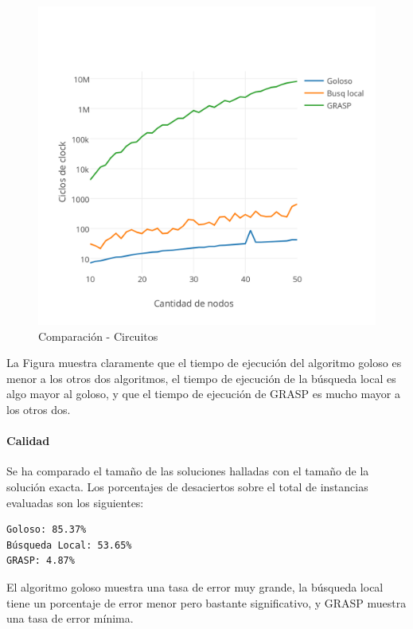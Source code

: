 \begin{figure}[htb]
	\begin{center}
    		\includegraphics[scale=0.8]{imagenes/final-circuitos.png}
	\end{center}
	\caption{Comparación - Circuitos}\label{fig:5A}
\end{figure}

La Figura muestra claramente que el tiempo de ejecución del algoritmo goloso es menor a los otros dos algoritmos, el tiempo de ejecución de la búsqueda local es algo mayor al goloso, y que el tiempo de ejecución de GRASP es mucho mayor a los otros dos.

\paragraph{Calidad} Se ha comparado el tamaño de las soluciones halladas con el tamaño de la solución exacta.  Los porcentajes de desaciertos sobre el total de instancias evaluadas son los siguientes:

\begin{verbatim}
Goloso: 85.37%
Búsqueda Local: 53.65%
GRASP: 4.87%
\end{verbatim}

El algoritmo goloso muestra una tasa de error muy grande, la búsqueda local tiene un porcentaje de error menor pero bastante significativo, y GRASP muestra una tasa de error mínima.

